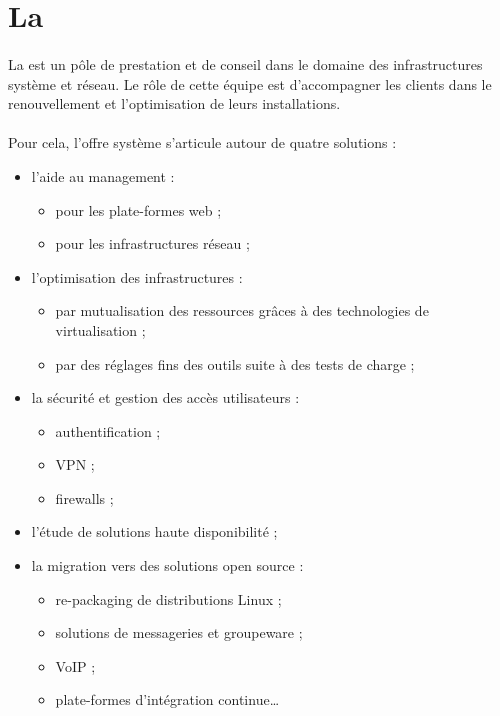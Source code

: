 \section{La \abusys{}}

\paragraph{}
La \abusys{} est un pôle de prestation et de conseil dans le domaine des infrastructures système et réseau.
Le rôle de cette équipe est d'accompagner les clients dans le renouvellement et l'optimisation de leurs installations.

\paragraph{}
Pour cela, l'offre système s'articule autour de quatre solutions :

\begin{itemize}
	\item l'aide au management :
	\begin{itemize}
		\item pour les plate-formes web ;
		\item pour les infrastructures réseau ;
	\end{itemize}
	\item l'optimisation des infrastructures :
	\begin{itemize}
		\item par mutualisation des ressources grâces à des technologies de virtualisation ;
		\item par des réglages fins des outils suite à des tests de charge ;
	\end{itemize}
	\item la sécurité et gestion des accès utilisateurs :
	\begin{itemize}
		\item authentification ;
		\item VPN ;
		\item firewalls ;
	\end{itemize}
	\item l'étude de solutions haute disponibilité ;
	\item la migration vers des solutions open source :
	\begin{itemize}
		\item re-packaging de distributions Linux ;
		\item solutions de messageries et groupeware ;
		\item VoIP ;
		\item plate-formes d'intégration continue\ldots
	\end{itemize}
\end{itemize}

